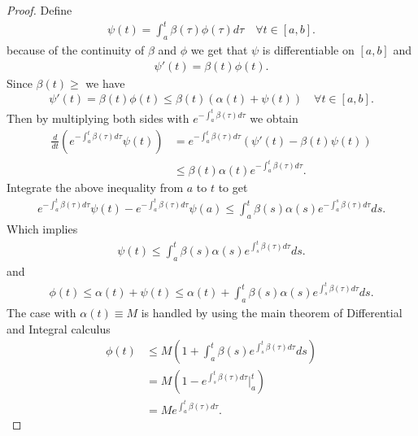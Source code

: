 \begin{proof}
 Define 
 \begin{align*}
   \psi   (t) = \int_a^{t} \beta(\tau ) \phi(\tau ) d\tau  \quad \forall t \in [a,b]
 .\end{align*}
 because of the continuity of $\beta $ and $\phi $ we get that $\psi $ is differentiable on $[a,b]$ and
 \begin{align*}
  \psi'(t) = \beta(t)\phi(t)
 .\end{align*}
 Since $\beta(t) \ge $ we have 
 \begin{align*}
   \psi'(t) = \beta(t) \phi(t) \le \beta(t) (\alpha(t)+\psi(t)) \quad \forall t \in [a,b]
 .\end{align*}
 Then by multiplying both sides with $e^{-\int_a^{t} \beta(\tau ) d\tau  } $ we obtain 
 \begin{align*}
   \frac{d}{dt} (e^{-\int_a^{t} \beta(\tau ) d\tau  }\psi(t) ) &= e^{-\int_a^{t} \beta(\tau ) d\tau  }(\psi'(t) - \beta(t)\psi(t))\\
                                                               &\le \beta(t)\alpha(t)e^{-\int_a^{t} \beta(\tau ) d\tau  }
 .\end{align*}
 Integrate the above inequality from  $a$ to $t$ to get 
 \begin{align*}
  e^{-\int_a^{t} \beta(\tau ) d\tau  }\psi(t) - e^{-\int_a^{t} \beta(\tau ) d\tau  }\psi (a) \le \int_a^{t} \beta(s)\alpha(s) e^{-\int_a^{s} \beta(\tau ) d\tau  }  ds
 .\end{align*}
 Which implies 
 \begin{align*}
  \psi(t) \le \int_a^{t} \beta(s)\alpha(s)  e^{\int_s^{t} \beta(\tau ) d\tau  } ds
 .\end{align*}
 and 
 \begin{align*}
  \phi(t) \le \alpha(t) + \psi(t) \le  \alpha(t) + \int_a^{t} \beta(s) \alpha(s)e^{\int_s^{t} \beta(\tau ) d\tau  }  ds
 .\end{align*}
 The case with $\alpha(t) \equiv M$ is handled by using the main theorem of Differential and Integral calculus 
 \begin{align*}
   \phi(t) &\le  M \left( 1+\int_a^{t} \beta(s) e^{\int_s^{t}\beta(\tau )d\tau  } ds   \right) \\
           &= M(1-e^{\int_s^{t} \beta(\tau ) d\tau  }\rvert_a^{t}  ) \\
           &= Me^{\int_a^{t}\beta(\tau ) d\tau  } 
 .\end{align*}
\end{proof}
\newpage
